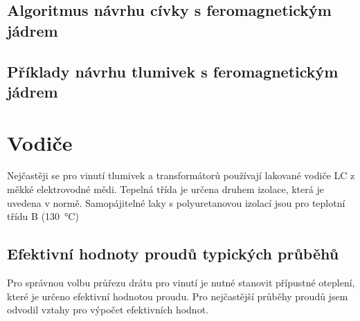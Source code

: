 {    \subsection{Algoritmus návrhu cívky s feromagnetickým jádrem}
      
    \subsection{Příklady návrhu tlumivek s feromagnetickým jádrem}
        
    
  \newpage
  \section{Vodiče}
    Nejčastěji se pro vinutí tlumivek a transformátorů používají lakované vodiče LC z měkké 
    elektrovodné mědi. Tepelná třída je určena druhem izolace, která je uvedena v normě. 
    Samopájitelné laky s polyuretanovou izolací jsou pro teplotní třídu B (\SI{130}{\celsius})
    
  \subsection{Efektivní hodnoty proudů typických prů\-bě\-hů}
    Pro správnou volbu průřezu drátu pro vinutí je nutné stanovit přípustné oteplení, které je 
    určeno efektivní hodnotou proudu. Pro nejčastější průběhy proudů jsem odvodil vztahy pro 
    výpočet efektivních hodnot.

}
